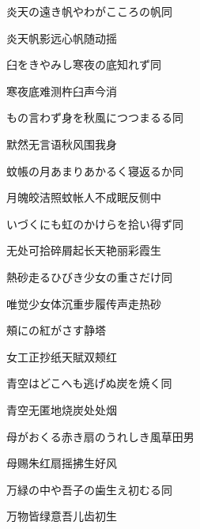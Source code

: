 \begin{haiku}
    {\FH 炎天の遠き帆やわがこころの帆}\hfill{\FH 同}

    {\FK 炎天帆影远心帆随动摇}
\end{haiku}

\begin{haiku}
    {\FH 臼をきやみし寒夜の底知れず}\hfill{\FH 同}

    {\FK 寒夜底难测杵臼声今消}
\end{haiku}

\begin{haiku}
    {\FH もの言わず身を秋風につつまるる}\hfill{\FH 同}

    {\FK 默然无言语秋风围我身}
\end{haiku}

\begin{haiku}
    {\FH 蚊帳の月あまりあかるく寝返るか}\hfill{\FH 同}

    {\FK 月魄皎洁照蚊帐人不成眠反侧中}
\end{haiku}

\begin{haiku}
    {\FH いづくにも虹のかけらを拾い得ず}\hfill{\FH 同}

    {\FK 无处可拾碎屑起长天艳丽彩霞生}
\end{haiku}

\begin{haiku}
    {\FH 熱砂走るひびき少女の重さだけ}\hfill{\FH 同}

    {\FK 唯觉少女体沉重步履传声走热砂}
\end{haiku}

\begin{haiku}
    {\FH {}頰にの紅がさす}\hfill{\FH 静塔}

    {\FK 女工正抄纸天賦双颊红}
\end{haiku}

\begin{haiku}
    {\FH 青空はどこへも逃げぬ炭を焼く}\hfill{\FH 同}

    {\FK 青空无匿地烧炭处处烟}
\end{haiku}

\begin{haiku}
    {\FH 母がおくる赤き扇のうれしき風}\hfill{\FH 草田男}

    {\FK 母赐朱红扇摇拂生好风}
\end{haiku}

\begin{haiku}
    {\FH 万緑の中や吾子の歯生え初むる}\hfill{\FH 同}

    {\FK 万物皆绿意吾儿齿初生}
\end{haiku}


